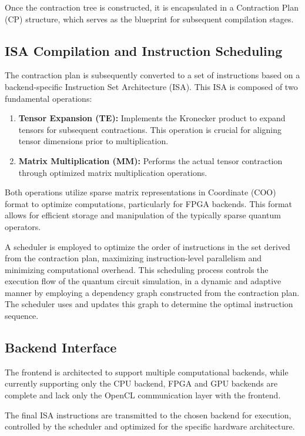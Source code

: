 \documentclass[12pt,oneside,a4paper]{article}
\begin{document}
Once the contraction tree is constructed, it is encapsulated in a Contraction Plan (CP) structure, which serves as the blueprint for subsequent compilation stages.

\subsection{ISA Compilation and Instruction Scheduling}

The contraction plan is subsequently converted to a set of instructions based on a backend-specific Instruction Set Architecture (ISA). This ISA is composed of two fundamental operations:

\begin{enumerate}
    \item \textbf{Tensor Expansion (TE):} Implements the Kronecker product to expand tensors for subsequent contractions. This operation is crucial for aligning tensor dimensions prior to multiplication.
    \item \textbf{Matrix Multiplication (MM):} Performs the actual tensor contraction through optimized matrix multiplication operations.
\end{enumerate}

Both operations utilize sparse matrix representations in Coordinate (COO) format to optimize computations, particularly for FPGA backends. This format allows for efficient storage and manipulation of the typically sparse quantum operators.

A scheduler is employed to optimize the order of instructions in the set derived from the contraction plan, maximizing instruction-level parallelism and minimizing computational overhead. This scheduling process controls the execution flow of the quantum circuit simulation, in a dynamic and adaptive manner by employing a dependency graph constructed from the contraction plan. The scheduler uses and updates this graph to determine the optimal instruction sequence.

\subsection{Backend Interface}

The frontend is architected to support multiple computational backends, while currently supporting only the CPU backend, FPGA and GPU backends are complete and lack only the OpenCL communication layer with the frontend.

The final ISA instructions are transmitted to the chosen backend for execution, controlled by the scheduler and optimized for the specific hardware architecture.
\end{document}
